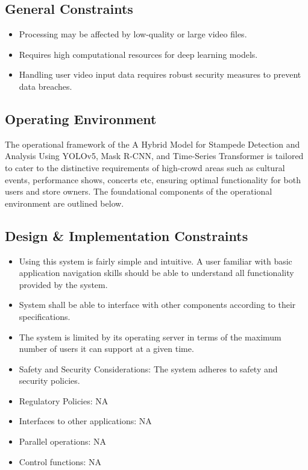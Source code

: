 \documentclass[11pt]{report}
\begin{document}
 \subsection{General Constraints}
        \begin{itemize}
            \item Processing may be affected by low-quality or large video files.
            \item Requires high computational resources for deep learning models.
            \item Handling user video input data requires robust security measures to prevent data breaches.
        \end{itemize}

\subsection{Operating Environment}

    The operational framework of the A Hybrid Model for Stampede Detection and Analysis Using YOLOv5, Mask R-CNN, and Time-Series Transformer is tailored to cater to the distinctive requirements of high-crowd areas such as cultural events, performance shows, concerts etc, ensuring optimal functionality for both users and store owners. The foundational components of the operational environment are outlined below.

\subsection{Design \& Implementation Constraints}
        \begin{itemize}
            \item  Using this system is fairly simple and intuitive. A user familiar with basic application navigation skills should be able to understand all functionality provided by the system.
             \item System shall be able to interface with other components according to their specifications.
            \item The system is limited by its operating server in terms of the maximum number of users it can support at a given time.
            \item Safety and Security Considerations: The system adheres to safety and security policies.
            \item Regulatory Policies: NA
            \item Interfaces to other applications: NA
            \item Parallel operations: NA
            \item Control functions: NA
        \end{itemize}
\end{document}
